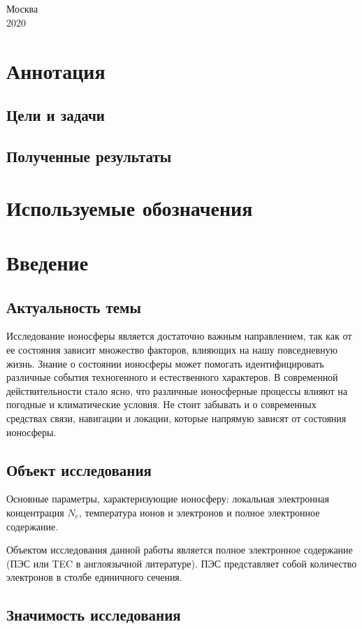\documentclass[14pt,eqno, fontsize=14pt]{article}
\begin{document}
~\

~\

~\

~\

\begin{center}
\small
Москва\\
2020
\end{center}

\newpage
\section*{Аннотация}
\subsection*{Цели и задачи}

\subsection*{Полученные результаты}

\newpage
\tableofcontents

\newpage
\section*{Используемые обозначения}

\newpage
\section*{Введение}
\subsection*{Актуальность темы}
Исследование ионосферы является достаточно важным направлением, так как от ее состояния зависит множество факторов, влияющих на нашу повседневную жизнь. Знание о состоянии ионосферы может помогать идентифицировать различные события техногенного и естественного характеров. В современной действительности стало ясно, что различные ионосферные процессы влияют на погодные и климатические условия. Не стоит забывать и о современных средствах связи, навигации и локации, которые напрямую зависят от состояния ионосферы.

\subsection*{Объект исследования}
Основные параметры, характеризующие ионосферу: локальная электронная концентрация $N_e$, температура ионов и электронов и полное электронное содержание.

Объектом исследования данной работы является полное электронное содержание (ПЭС или TEC в англоязычной литературе). ПЭС представляет собой количество электронов в столбе единичного сечения.

\subsection*{Значимость исследования}


\newpage
\end{document}
